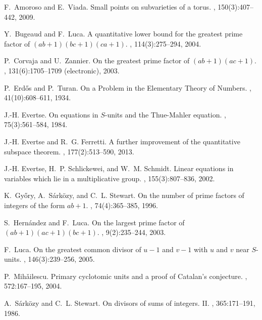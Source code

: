 \documentclass{amsart}
\theoremstyle{remark}
\begin{document}
\begin{thebibliography}{10}

F.~Amoroso and E.~Viada.
\newblock Small points on subvarieties of a torus.
, 150(3):407--442, 2009.

Y.~Bugeaud and F.~Luca.
\newblock A quantitative lower bound for the greatest prime factor of
  {$(ab+1)(bc+1)(ca+1)$}.
, 114(3):275--294, 2004.

P.~Corvaja and U.~Zannier.
\newblock On the greatest prime factor of {$(ab+1)(ac+1)$}.
, 131(6):1705--1709 (electronic), 2003.

P.~Erd\H{o}s and P.~Turan.
\newblock On a {P}roblem in the {E}lementary {T}heory of {N}umbers.
, 41(10):608--611, 1934.

J.-H. Evertse.
\newblock On equations in {$S$}-units and the {T}hue-{M}ahler equation.
, 75(3):561--584, 1984.

J.-H. Evertse and R.~G. Ferretti.
\newblock A further improvement of the quantitative subspace theorem.
, 177(2):513--590, 2013.

J.-H. Evertse, H.~P. Schlickewei, and W.~M. Schmidt.
\newblock Linear equations in variables which lie in a multiplicative group.
, 155(3):807--836, 2002.

K.~Gy{\H{o}}ry, A.~S{\'a}rk{\"o}zy, and C.~L. Stewart.
\newblock On the number of prime factors of integers of the form {$ab+1$}.
, 74(4):365--385, 1996.

S.~Hern{\'a}ndez and F.~Luca.
\newblock On the largest prime factor of {$(ab+1)(ac+1)(bc+1)$}.
, 9(2):235--244, 2003.

F.~Luca.
\newblock On the greatest common divisor of {$u-1$} and {$v-1$} with {$u$} and
  {$v$} near {$S$}-units.
, 146(3):239--256, 2005.

P.~Mih{\v{a}}ilescu.
\newblock Primary cyclotomic units and a proof of {C}atalan's conjecture.
, 572:167--195, 2004.

A.~S{\'a}rk{\"o}zy and C.~L. Stewart.
\newblock On divisors of sums of integers. {II}.
, 365:171--191, 1986.


\end{thebibliography}
\end{document}
